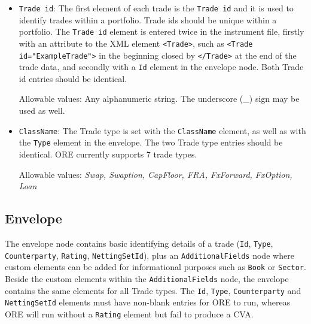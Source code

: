 \begin{itemize}
\item {\tt Trade id}: The first element of each trade is the {\tt Trade id} and it is used to identify trades within a portfolio. Trade ids should be unique within a portfolio.  The {\tt Trade id} element is entered twice in the instrument file, firstly with an attribute to the XML element {\tt <Trade>}, such as {\tt <Trade id="ExampleTrade">}  in the beginning closed by {\tt </Trade>}  at the end of the trade data, and secondly with a {\tt Id} element  in the envelope node.   Both Trade id entries should be identical.



Allowable values:  Any alphanumeric string. The underscore (\_) sign may be used as well. 


\item {\tt ClassName}: The Trade type is set with the {\tt ClassName} element, as well as with the {\tt Type} element in the envelope. The two Trade type entries should be identical. ORE currently supports 7 trade types.  



Allowable values:  \emph{Swap, Swaption, CapFloor, FRA, FxForward, FxOption, Loan}


\end{itemize}

\subsection{Envelope}\label{ss:envelope}
The envelope node contains basic identifying details of a trade ({\tt Id}, {\tt Type}, {\tt Counterparty}, {\tt Rating}, {\tt NettingSetId}), plus an {\tt AdditionalFields} node where custom elements can be added for informational purposes such as {\tt Book} or {\tt Sector}. Beside the custom elements within the {\tt AdditionalFields} node, the envelope contains the same elements for all Trade types.  The {\tt Id}, {\tt Type}, {\tt Counterparty} and {\tt NettingSetId} elements must have non-blank entries for ORE to run, whereas ORE will run without a {\tt Rating} element but fail to produce a CVA.

\vspace{1em}

